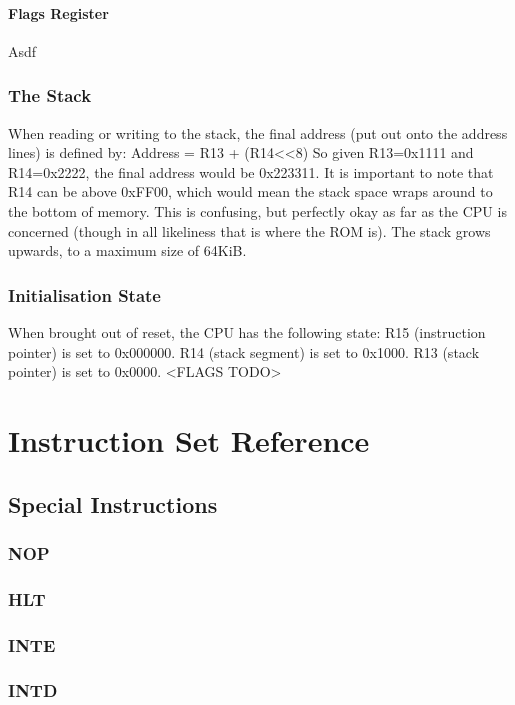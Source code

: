 \documentclass[a4paper]{report}
\begin{document}
\subsection{Flags Register}
Asdf

\section{The Stack}
When reading or writing to the stack, the final address (put out onto the address lines) is defined by:
Address = R13 + (R14<<8)
So given R13=0x1111 and R14=0x2222, the final address would be 0x223311. It is important to note that R14 can be above 0xFF00, which would mean the stack space wraps around to the bottom of memory. This is confusing, but perfectly okay as far as the CPU is concerned (though in all likeliness that is where the ROM is).
The stack grows upwards, to a maximum size of 64KiB.

\section{Initialisation State}
When brought out of reset, the CPU has the following state:
R15 (instruction pointer) is set to 0x000000.
R14 (stack segment) is set to 0x1000.
R13 (stack pointer) is set to 0x0000.
<FLAGS TODO>

\part{Instruction Set Reference}

\chapter{Special Instructions}

\section{NOP}

\section{HLT}

\section{INTE}

\section{INTD}
\end{document}
